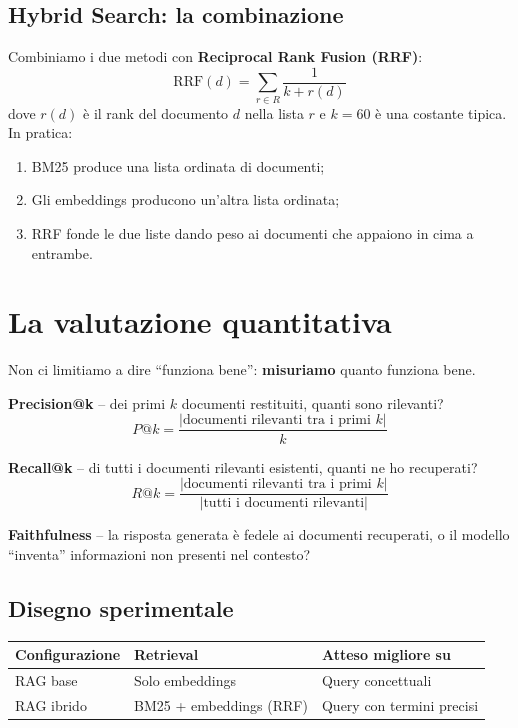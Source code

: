 \documentclass[12pt,a4paper]{article}
\begin{document}
\subsection{Hybrid Search: la combinazione}

Combiniamo i due metodi con \textbf{Reciprocal Rank Fusion (RRF)}:
\[
  \mathrm{RRF}(d) = \sum_{r \in R} \frac{1}{k + r(d)}
\]
dove $r(d)$ è il rank del documento $d$ nella lista $r$ e $k=60$ è una costante
tipica. In pratica:
\begin{enumerate}
  \item BM25 produce una lista ordinata di documenti;
  \item Gli embeddings producono un'altra lista ordinata;
  \item RRF fonde le due liste dando peso ai documenti che appaiono in cima a entrambe.
\end{enumerate}

\section{La valutazione quantitativa}

Non ci limitiamo a dire ``funziona bene'': \textbf{misuriamo} quanto funziona bene.

\textbf{Precision@k} -- dei primi $k$ documenti restituiti, quanti sono rilevanti?
\[
  P@k = \frac{|\text{documenti rilevanti tra i primi } k|}{k}
\]

\textbf{Recall@k} -- di tutti i documenti rilevanti esistenti, quanti ne ho recuperati?
\[
  R@k = \frac{|\text{documenti rilevanti tra i primi } k|}{|\text{tutti i documenti rilevanti}|}
\]

\textbf{Faithfulness} -- la risposta generata è fedele ai documenti recuperati,
o il modello ``inventa'' informazioni non presenti nel contesto?

\subsection{Disegno sperimentale}

\begin{center}
\begin{tabular}{lll}
\toprule
\textbf{Configurazione} & \textbf{Retrieval} & \textbf{Atteso migliore su} \\
\midrule
RAG base    & Solo embeddings         & Query concettuali \\
RAG ibrido  & BM25 + embeddings (RRF) & Query con termini precisi \\
\bottomrule
\end{tabular}
\end{center}
\end{document}
